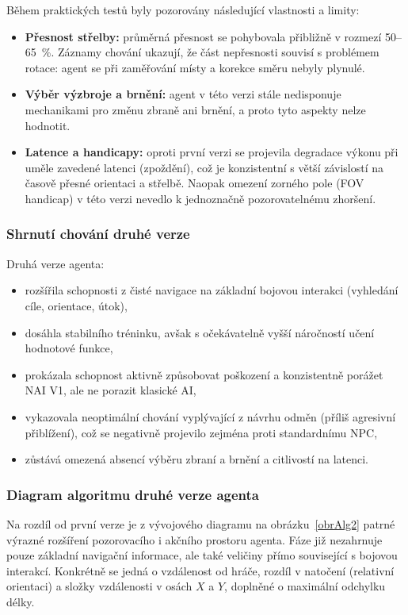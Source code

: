Během praktických testů byly pozorovány následující vlastnosti a limity:

\begin{itemize}
    \item \textbf{Přesnost střelby:} průměrná přesnost se pohybovala přibližně v rozmezí 50--65~\%. Záznamy chování ukazují, že část nepřesnosti souvisí s problémem rotace: agent se při zaměřování místy  a korekce směru nebyly plynulé.
    \item \textbf{Výběr výzbroje a brnění:} agent v této verzi stále nedisponuje mechanikami pro změnu zbraně ani brnění, a proto tyto aspekty nelze hodnotit.
    \item \textbf{Latence a handicapy:} oproti první verzi se projevila degradace výkonu při uměle zavedené latenci (zpoždění), což je konzistentní s větší závislostí na časově přesné orientaci a střelbě. Naopak omezení zorného pole (FOV handicap) v této verzi nevedlo k jednoznačně pozorovatelnému zhoršení.
\end{itemize}

\subsubsection{Shrnutí chování druhé verze}

Druhá verze agenta:

\begin{itemize}
    \item rozšířila schopnosti z čisté navigace na základní bojovou interakci (vyhledání cíle, orientace, útok),
    \item dosáhla stabilního tréninku, avšak s očekávatelně vyšší náročností učení hodnotové funkce,
    \item prokázala schopnost aktivně způsobovat poškození a konzistentně porážet NAI V1, ale ne porazit klasické AI,
    \item vykazovala neoptimální chování vyplývající z návrhu odměn (příliš agresivní přiblížení), což se negativně projevilo zejména proti standardnímu NPC,
    \item zůstává omezená absencí výběru zbraní a brnění a citlivostí na latenci.
\end{itemize}

\subsubsection{Diagram algoritmu druhé verze agenta}

Na rozdíl od první verze je z vývojového diagramu na obrázku~\ref{obrAlg2} patrné výrazné rozšíření pozorovacího i akčního prostoru agenta. Fáze  již nezahrnuje pouze základní navigační informace, ale také veličiny přímo související s bojovou interakcí. Konkrétně se jedná o vzdálenost od hráče, rozdíl v natočení (relativní orientaci) a složky vzdálenosti v osách $X$ a $Y$, doplněné o maximální odchylku délky.

